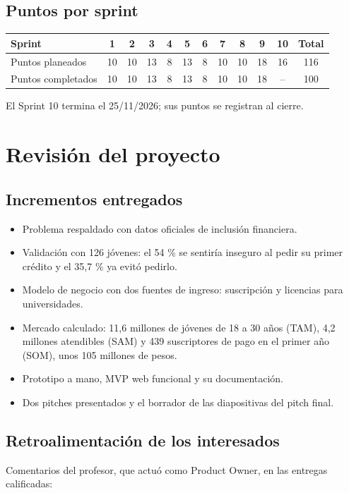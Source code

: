 \documentclass[11pt,a4paper]{article}
\begin{document}
\subsection{Puntos por sprint}

{\setlength{\tabcolsep}{4pt}
\begin{tabularx}{\textwidth}{X c c c c c c c c c c c}
  \toprule
  \textbf{Sprint} & \textbf{1} & \textbf{2} & \textbf{3} & \textbf{4} & \textbf{5} & \textbf{6} & \textbf{7} & \textbf{8} & \textbf{9} & \textbf{10} & \textbf{Total} \\
  \midrule
  Puntos planeados    & 10 & 10 & 13 & 8 & 13 & 8 & 10 & 10 & 18 & 16 & 116 \\
  Puntos completados  & 10 & 10 & 13 & 8 & 13 & 8 & 10 & 10 & 18 & -- & 100 \\
  \bottomrule
\end{tabularx}}

{El Sprint 10 termina el 25/11/2026; sus puntos se registran al cierre.}

\section{Revisión del proyecto}

\subsection{Incrementos entregados}
\begin{itemize}[leftmargin=1.5em]
  \item {Problema respaldado con datos oficiales de inclusión financiera.}
  \item {Validación con 126 jóvenes: el 54 \% se sentiría inseguro al pedir su primer crédito y el 35,7 \% ya evitó pedirlo.}
  \item {Modelo de negocio con dos fuentes de ingreso: suscripción y licencias para universidades.}
  \item {Mercado calculado: 11,6 millones de jóvenes de 18 a 30 años (TAM), 4,2 millones atendibles (SAM) y 439 suscriptores de pago en el primer año (SOM), unos 105 millones de pesos.}
  \item {Prototipo a mano, MVP web funcional y su documentación.}
  \item {Dos pitches presentados y el borrador de las diapositivas del pitch final.}
\end{itemize}

\subsection{Retroalimentación de los interesados}
{Comentarios del profesor, que actuó como Product Owner, en las entregas calificadas:}
\end{document}
